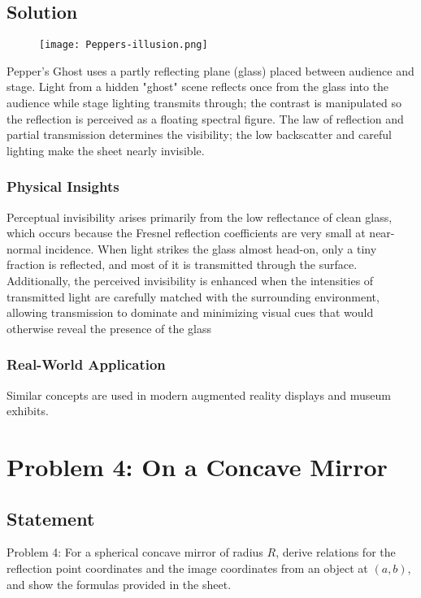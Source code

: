 \documentclass[12pt,a4paper]{article}
\begin{document}
\subsection*{Solution}
\begin{figure}
  \texttt{[image: Peppers-illusion.png]}
\end{figure}
Pepper's Ghost uses a partly reflecting plane (glass) placed between audience and stage. Light from a hidden "ghost" scene reflects once from the glass into the audience while stage lighting transmits through; the contrast is manipulated so the reflection is perceived as a floating spectral figure. The law of reflection and partial transmission determines the visibility; the low backscatter and careful lighting make the sheet nearly invisible.

\subsubsection*{Physical Insights}
Perceptual invisibility arises primarily from the low reflectance of clean glass, which occurs because the Fresnel reflection coefficients are very small at near-normal incidence. When light strikes the glass almost head-on, only a tiny fraction is reflected, and most of it is transmitted through the surface. Additionally, the perceived invisibility is enhanced when the intensities of transmitted light are carefully matched with the surrounding environment, allowing transmission to dominate and minimizing visual cues that would otherwise reveal the presence of the glass

\subsubsection*{Real-World Application}
Similar concepts are used in modern augmented reality displays and museum exhibits.

\newpage

\section{Problem 4: On a Concave Mirror}
\subsection*{Statement }
Problem 4: For a spherical concave mirror of radius $R$, derive relations for the reflection point coordinates and the image coordinates from an object at $(a,b)$, and show the formulas provided in the sheet.
\end{document}
